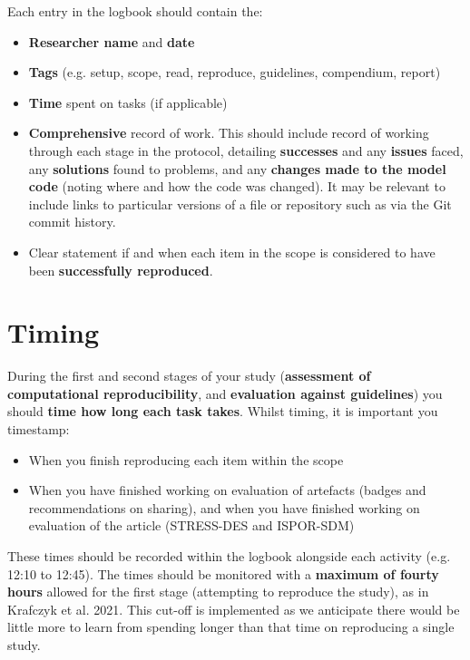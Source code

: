Each entry in the logbook should contain the:
\begin{itemize}
    \item \textbf{Researcher name} and \textbf{date}
    \item \textbf{Tags} (e.g. setup, scope, read, reproduce, guidelines, compendium, report)
    \item \textbf{Time} spent on tasks (if applicable)
    \item \textbf{Comprehensive} record of work. This should include record of working through each stage in the protocol, detailing \textbf{successes} and any \textbf{issues} faced, any \textbf{solutions} found to problems, and any \textbf{changes made to the model code} (noting where and how the code was changed). It may be relevant to include links to particular versions of a file or repository such as via the Git commit history.
    \item Clear statement if and when each item in the scope is considered to have been \textbf{successfully reproduced}.
\end{itemize}

\newpage
\section{Timing}

During the first and second stages of your study (\textbf{assessment of computational reproducibility}, and \textbf{evaluation against guidelines}) you should \textbf{time how long each task takes}. Whilst timing, it is important you timestamp:
\begin{itemize}
    \item When you finish reproducing each item within the scope
    \item When you have finished working on evaluation of artefacts (badges and recommendations on sharing), and when you have finished working on evaluation of the article (STRESS-DES and ISPOR-SDM)
\end{itemize}

These times should be recorded within the logbook alongside each activity (e.g. 12:10 to 12:45). The times should be monitored with a \textbf{maximum of fourty hours} allowed for the first stage (attempting to reproduce the study), as in Krafczyk et al. 2021.\autocite{krafczyk_learning_2021} This cut-off is implemented as we anticipate there would be little more to learn from spending longer than that time on reproducing a single study.

